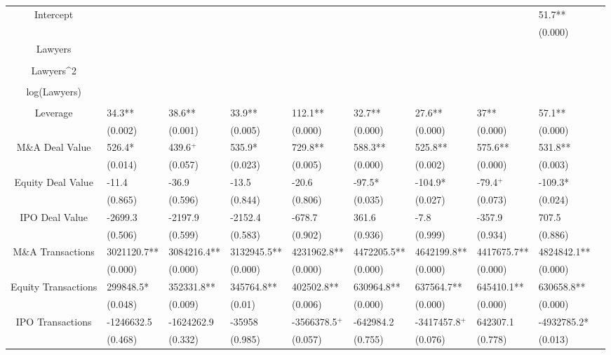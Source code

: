 \documentclass{article}
\begin{document}
\begin{table}[H]
\begin{tabular}{|clllllllll|}
Intercept &  &  &  &  &  &  &  & 51.7** & \\ 
   &  &  &  &  &  &  &  & (0.000) & \\ 
  Lawyers &  &  &  &  &  &  &  &  & \\ 
   &  &  &  &  &  &  &  &  & \\ 
  Lawyers^2 &  &  &  &  &  &  &  &  & \\ 
   &  &  &  &  &  &  &  &  & \\ 
  log(Lawyers) &  &  &  &  &  &  &  &  & \\ 
   &  &  &  &  &  &  &  &  & \\ 
  Leverage & 34.3** & 38.6** & 33.9** & 112.1** & 32.7** & 27.6** & 37** & 57.1** & \\ 
   & (0.002) & (0.001) & (0.005) & (0.000) & (0.000) & (0.000) & (0.000) & (0.000) & \\ 
  M\&A Deal Value & 526.4* & 439.6$^{+}$ & 535.9* & 729.8** & 588.3** & 525.8** & 575.6** & 531.8** & \\ 
   & (0.014) & (0.057) & (0.023) & (0.005) & (0.000) & (0.002) & (0.000) & (0.003) & \\ 
  Equity Deal Value & -11.4 & -36.9 & -13.5 & -20.6 & -97.5* & -104.9* & -79.4$^{+}$ & -109.3* & \\ 
   & (0.865) & (0.596) & (0.844) & (0.806) & (0.035) & (0.027) & (0.073) & (0.024) & \\ 
  IPO Deal Value & -2699.3 & -2197.9 & -2152.4 & -678.7 & 361.6 & -7.8 & -357.9 & 707.5 & \\ 
   & (0.506) & (0.599) & (0.583) & (0.902) & (0.936) & (0.999) & (0.934) & (0.886) & \\ 
  M\&A Transactions & 3021120.7** & 3084216.4** & 3132945.5** & 4231962.8** & 4472205.5** & 4642199.8** & 4417675.7** & 4824842.1** & \\ 
   & (0.000) & (0.000) & (0.000) & (0.000) & (0.000) & (0.000) & (0.000) & (0.000) & \\ 
  Equity Transactions & 299848.5* & 352331.8** & 345764.8** & 402502.8** & 630964.8** & 637564.7** & 645410.1** & 630658.8** & \\ 
   & (0.048) & (0.009) & (0.01) & (0.006) & (0.000) & (0.000) & (0.000) & (0.000) & \\ 
  IPO Transactions & -1246632.5 & -1624262.9 & -35958 & -3566378.5$^{+}$ & -642984.2 & -3417457.8$^{+}$ & 642307.1 & -4932785.2* & \\ 
   & (0.468) & (0.332) & (0.985) & (0.057) & (0.755) & (0.076) & (0.778) & (0.013) & \\ 

\end{tabular}
\end{table}
\end{document}
